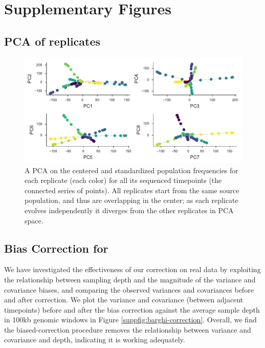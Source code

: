 \documentclass[11pt]{article}
\begin{document}
{\setcounter{section}{1}
\section*{Supplementary Figures}

\subsection{PCA of \textcite{Barghi2019-qy} replicates}

\begin{figure}[!ht]
  \centering

  \includegraphics[]{figures/barghi-panel-pca.pdf}

  \caption{A PCA on the centered and standardized population frequencies for
  each replicate (each color) for all its sequenced timepoints (the connected
  series of points). All replicates start from the same source population, and
  thus are overlapping in the center; as each replicate evolves independently it
  diverges from the other replicates in PCA space.}
  
  \label{suppfig:barghi-pca}
\end{figure}

\subsection{Bias Correction for \textcite{Barghi2019-qy}}

We have investigated the effectiveness of our correction on real data by
exploiting the relationship between sampling depth and the magnitude of the
variance and covariance biases, and comparing the observed variances and
covariances before and after correction. We plot the variance and covariance
(between adjacent timepoints) before and after the bias correction against the
average sample depth in 100kb genomic windows in Figure
\ref{suppfig:barghi-correction}. Overall, we find the biased-correction
procedure removes the relationship between variance and covariance and depth, indicating it is working adequately.

}
\end{document}
